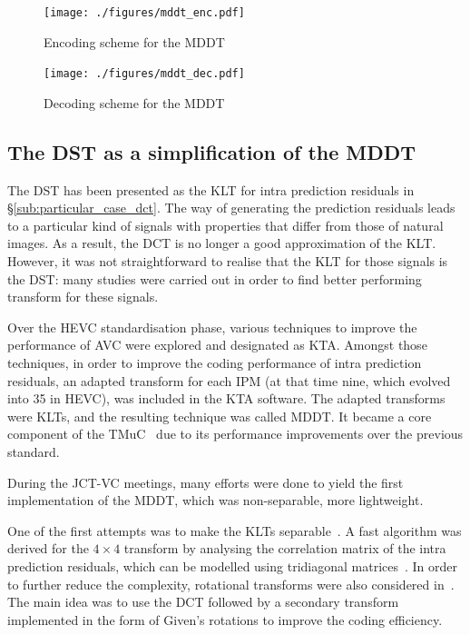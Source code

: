 \documentclass[11pt,a4paper,openright,twoside]{book}
\numberwithin{equation}{section} %
\numberwithin{figure}{section} %
\numberwithin{table}{section} %
\begin{document}
\begin{figure}[tp]
	\centering
	\texttt{[image: ./figures/mddt\_enc.pdf]}
	\caption{Encoding scheme for the \acs{MDDT}}
	\label{fig:mddt_enc}
\end{figure}

\begin{figure}[tp]
	\centering
	\texttt{[image: ./figures/mddt\_dec.pdf]}
	\caption{Decoding scheme for the \acs{MDDT}}
	\label{fig:mddt_dec}
\end{figure}

\subsection{The \acs{DST} as a simplification of the \acs{MDDT}}
\label{sub:dst_and_mddt}

The \ac{DST} has been presented as the \ac{KLT} for intra prediction residuals
in \S\ref{sub:particular_case_dct}.
The way of generating the prediction residuals leads to a particular
kind of signals with properties that differ from those of natural
images.
As a result, the \ac{DCT} is no longer a good approximation of the
\ac{KLT}.
However, it was not straightforward to realise that the \ac{KLT} for those
signals is the \ac{DST}:
many studies were carried out in order to find better performing transform for
these signals.

Over the \ac{HEVC} standardisation phase, various techniques to
improve the performance of \ac{AVC} were explored and designated as \ac{KTA}.
Amongst those techniques, in order to improve the coding performance of
intra prediction residuals, an adapted transform for each \ac{IPM} (at
that time nine, which evolved into 35 in \ac{HEVC}), was included in the
\ac{KTA} software.
The adapted transforms were \acp{KLT}, and the resulting technique was
called \ac{MDDT}.
It became a core component of the \ac{TMuC}~\cite{JCTVC-A204} due to its
performance improvements over the previous standard.

During the \ac{JCT-VC} meetings, many efforts were done to yield the
first implementation of the \ac{MDDT}, which was non-separable, more
lightweight.

One of the first attempts was to make the \acp{KLT}
separable~\cite{JCTVC-B024}.
A fast algorithm was derived for the $4\times4$ transform by analysing
the correlation matrix of the intra prediction residuals, which can be
modelled using tridiagonal
matrices~\cite{yueh-05-eigenvalues-tridiagonal}.
In order to further reduce the complexity, rotational transforms were
also considered in~\cite{JCTVC-C096}.
The main idea was to use the \ac{DCT} followed by a secondary transform
implemented in the form of Given's rotations to improve the coding
efficiency.
\end{document}
